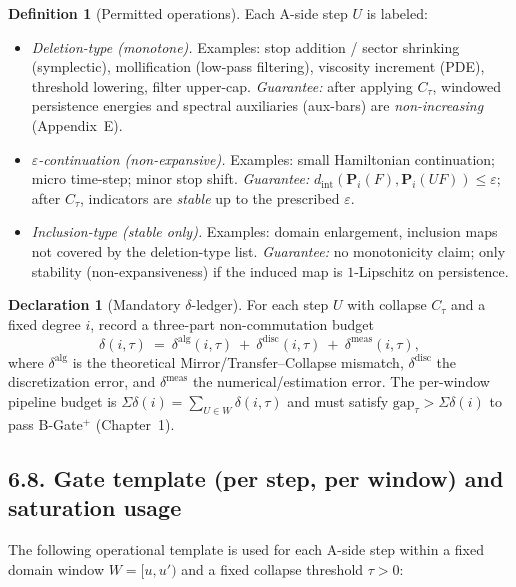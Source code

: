 \documentclass[11pt]{article}
\DeclareRobustCommand{\hyp}{\nobreakdash-}
\numberwithin{equation}{section}
\theoremstyle{definition}
\newtheorem{definition}[theorem]{Definition}
\newtheorem{declaration}[theorem]{Declaration}
\begin{document}
\begin{definition}[Permitted operations]\label{def:ops-catalog}
Each A\hyp side step $U$ is labeled:
\begin{itemize}
  \item \emph{Deletion\hyp type (monotone).} Examples: stop addition / sector shrinking (symplectic), mollification (low\hyp pass filtering), viscosity increment (PDE), threshold lowering, filter upper\hyp cap. \emph{Guarantee:} after applying $C_\tau$, windowed persistence energies and spectral auxiliaries (aux\hyp bars) are \emph{non\hyp increasing} (Appendix~E).
  \item \emph{$\varepsilon$-continuation (non\hyp expansive).} Examples: small Hamiltonian continuation; micro time\hyp step; minor stop shift. \emph{Guarantee:} $d_{\mathrm{int}}(\mathbf{P}_i(F),\mathbf{P}_i(UF))\le \varepsilon$; after $C_\tau$, indicators are \emph{stable} up to the prescribed $\varepsilon$.
  \item \emph{Inclusion\hyp type (stable only).} Examples: domain enlargement, inclusion maps not covered by the deletion\hyp type list. \emph{Guarantee:} no monotonicity claim; only stability (non\hyp expansiveness) if the induced map is $1$-Lipschitz on persistence.
\end{itemize}
\end{definition}

\begin{declaration}[Mandatory $\delta$-ledger]\label{dec:delta-ledger-ch6}
For each step $U$ with collapse $C_{\tau}$ and a fixed degree $i$, record a three\hyp part non\hyp commutation budget
\[
\delta(i,\tau)\ =\ \delta^{\mathrm{alg}}(i,\tau)\ +\ \delta^{\mathrm{disc}}(i,\tau)\ +\ \delta^{\mathrm{meas}}(i,\tau),
\]
where $\delta^{\mathrm{alg}}$ is the theoretical Mirror/Transfer–Collapse mismatch, $\delta^{\mathrm{disc}}$ the discretization error, and $\delta^{\mathrm{meas}}$ the numerical/estimation error. The per\hyp window pipeline budget is $\Sigma\delta(i)=\sum_{U\in W}\delta(i,\tau)$ and must satisfy $\mathrm{gap}_\tau>\Sigma\delta(i)$ to pass B\hyp Gate$^{+}$ (Chapter~1).
\end{declaration}

\subsection*{6.8. Gate template (per step, per window) and saturation usage}\label{subsec:gate-template}
The following operational template is used for each A\hyp side step within a fixed domain window $W=[u,u')$ and a fixed collapse threshold $\tau>0$:
\end{document}
